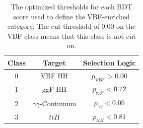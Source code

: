 \begin{table}[!htb]
  \centering
  \caption[The optimized thresholds for each \gls{BDT} score used to define the VBF-enriched category]{The optimized thresholds for each \gls{BDT} score used to define the VBF-enriched category. The cut threshold of 0.00 on the VBF \hh class means that this class is not cut on.}
  \begin{tabular}{c|c|c}
    \hline
    Class & Target & Selection Logic  \\
    \hline
    0 & VBF HH & $p_{\text{VBF}} > 0.00 $ \\
    1 & ggF HH & $p_{\text{ggF}} < 0.72 $ \\
    2 & $\gamma\gamma$-Continuum &  $p_{\gamma\gamma} < 0.06$ \\
    3 & $ttH$ &  $p_{ttH} < 0.81$ \\
    \hline
  \end{tabular}
  \label{tab:multiclass-thresholds}
\end{table}

